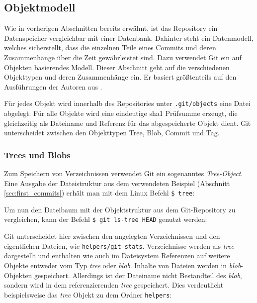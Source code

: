 \subsection{Objektmodell}\label{sec:objectmodel}
Wie in vorherigen Abschnitten bereits erwähnt, ist das Repository ein
Datenspeicher vergleichbar mit einer Datenbank. Dahinter steht ein Datenmodell,
welches sicherstellt, dass die einzelnen Teile eines Commits und deren
Zusammenhänge über die Zeit gewährleistet sind. Dazu verwendet Git ein auf
Objekten basierendes Modell. Dieser Abschnitt geht auf die verschiedenen
Objekttypen und deren Zusammenhänge ein. Er basiert größtenteils auf den
Ausführungen der Autoren aus \cite[S.~49-59]{gitosp}.

Für jedes Objekt wird innerhalb des Repositories unter \texttt{.git/objects}
eine Datei abgelegt. Für alle Objekte wird eine eindeutige \gls{sha1}
Prüfsumme erzeugt, die gleichzeitig als Dateiname und Referenz für das
abgespeicherte Objekt dient. Git unterscheidet zwischen den Objekttypen Tree,
Blob, Commit und Tag.

\subsubsection{Trees und Blobs}\label{sec:treeblobobjects}
Zum Speichern von Verzeichnissen verwendet Git ein sogenanntes
\textit{Tree-Object}. Eine Ausgabe der Dateistruktur aus dem verwendeten
Beispiel (Abschnitt \ref{sec:first_commits}) erhält man mit dem Linux Befehl
\texttt{\$ tree}:


Um nun den Dateibaum mit der Objektstruktur aus dem Git-Repository zu
vergleichen, kann der Befehl \texttt{\$ git ls-tree HEAD} genutzt werden:


Git unterscheidet hier zwischen den angelegten Verzeichnissen und den
eigentlichen Dateien, wie \texttt{helpers/git-stats}. Verzeichnisse werden als
\textit{tree} dargestellt und enthalten wie auch im Dateisystem Referenzen auf
weitere Objekte entweder vom Typ \textit{tree} oder \textit{blob}.  Inhalte von
Dateien werden in \textit{blob}-Objekten gespeichert. Allerdings ist der
Dateiname nicht Bestandteil des \textit{blob}, sondern wird in dem
referenzierenden \textit{tree} gespeichert. Dies verdeutlicht beispielsweise
das \textit{tree} Objekt zu dem Ordner \texttt{helpers}:

